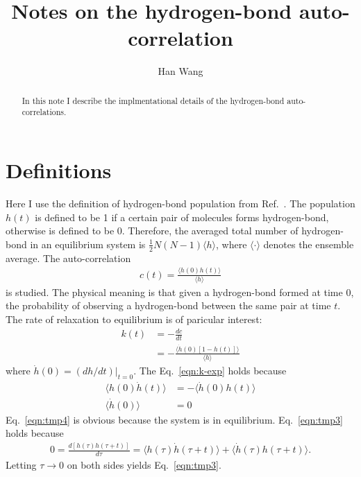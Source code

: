 \documentclass[unsortedaddress,a4paper,onecolumn]{revtex4}
\begin{document}
\title{Notes on the hydrogen-bond auto-correlation}
\author{Han Wang}
   
\begin{abstract}
  In this note I describe the implmentational details of the hydrogen-bond auto-correlations.
\end{abstract}

\maketitle

\section{Definitions}
Here I use the definition of hydrogen-bond population from
Ref.~\cite{luzar1996effect, luzar1996hydrogen}.  The population $h(t)$
is defined to be 1 if a certain pair of molecules forms hydrogen-bond,
otherwise is defined to be 0. Therefore, the averaged total number of
hydrogen-bond in an equilibrium system is $\frac12 N(N-1)\langle
h\rangle$, where $\langle\cdot\rangle$ denotes the ensemble average.
The auto-correlation
\begin{align}
  c(t) = \frac{\langle h(0) h(t)\rangle}{\langle h\rangle}
\end{align}
is studied. The physical meaning is that given a hydrogen-bond formed
at time $0$, the probability of observing a hydrogen-bond between the
same pair at time $t$.
The rate of relaxation to equilibrium is of paricular interest:
\begin{align}\label{eqn:k-def}
  k(t) &= -\frac{dc}{dt}\\\label{eqn:k-exp}
  &= -\frac{\langle \dot h(0) [1 - h(t)] \rangle}{\langle h\rangle}
\end{align}
where $\dot h(0) = (dh/dt)\vert_{t=0}$. The Eq.~\eqref{eqn:k-exp} holds because
\begin{align} \label{eqn:tmp3}
  \langle h(0) \dot h(t) \rangle &= - \langle \dot h(0) h(t)\rangle \\\label{eqn:tmp4}
  \langle \dot h(0) \rangle &= 0
\end{align}
Eq.~\eqref{eqn:tmp4} is obvious because the system is in equilibrium. Eq.~\eqref{eqn:tmp3} holds because
\begin{align}
  0 = \frac{d [ h(\tau) h(\tau+t) ] }{d\tau} =  \langle h(\tau) \dot h(\tau+t)\rangle  + \langle \dot h(\tau) h(\tau+t)\rangle.
\end{align}
Letting $\tau \rightarrow 0$ on both sides yields Eq.~\eqref{eqn:tmp3}.
\end{document}
